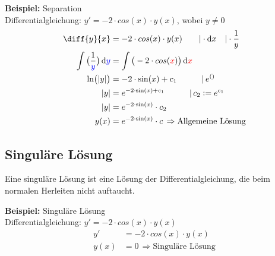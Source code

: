 \documentclass[10pt,a4paper]{article}
\begin{document}
\begin{mdframed}
  \textbf{Beispiel:} Separation\\
  Differentialgleichung: $y' = -2 \cdot cos(x) \cdot y(x)$, wobei $y \neq 0$
  \begin{align*}
    \diff{y}{x} &= -2 \cdot cos(x) \cdot y(x) \qquad |\cdot \dif x \quad |\cdot \frac{1}{y}\\
    \int \big(\frac{1}{\textcolor{blue}{y}}\big) \dif \textcolor{blue}{y} &= \int \big(-2 \cdot cos(\textcolor{red}{x})\big) \dif \textcolor{red}{x}\\
    \ln(|y|) &= -2 \cdot \sin(x) + c_1 \qquad \quad | \, e^{()}\\
     |y| &= e^{-2 \cdot \sin(x) + c_1} \qquad \quad | \, c_2 := e^{c_1}\\
     |y| &= e^{-2 \cdot \sin(x)} \cdot c_2\\
     y(x) &= e^{-2 \cdot \sin(x)} \cdot c \, \Rightarrow \text{Allgemeine Lösung}
  \end{align*}
\end{mdframed}

\subsection{Singuläre Lösung}
Eine singuläre Lösung ist eine Lösung der Differentialgleichung, die beim normalen Herleiten nicht auftaucht.
\begin{mdframed}
  \textbf{Beispiel:} Singuläre Lösung\\
  Differentialgleichung: $y' = -2 \cdot cos(x) \cdot y(x)$
  \begin{align*}
     y' &= -2 \cdot cos(x) \cdot y(x)\\
     y(x) &= 0 \, \Rightarrow \text{Singuläre Lösung}
  \end{align*}
\end{mdframed}
\end{document}
